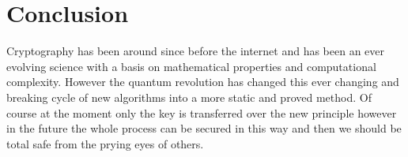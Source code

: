 \documentclass[12pt]{article}
\begin{document}
\section{Conclusion}
Cryptography has been around since before the internet and has been
an ever evolving science with a basis on mathematical properties and 
computational complexity. However the quantum revolution has changed this
ever changing and breaking cycle of new algorithms into a more static and
proved method. Of course at the moment only the key is transferred over the
new principle however in the future the whole process can be secured in this
way and then we should be total safe from the prying eyes of others.
\end{document}
